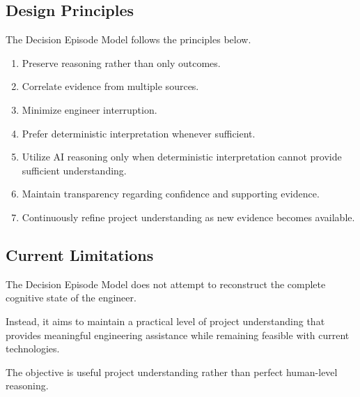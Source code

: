 \subsection{Design Principles}

The Decision Episode Model follows the principles below.

\begin{enumerate}
    \item Preserve reasoning rather than only outcomes.
    \item Correlate evidence from multiple sources.
    \item Minimize engineer interruption.
    \item Prefer deterministic interpretation whenever sufficient.
    \item Utilize AI reasoning only when deterministic interpretation cannot provide sufficient understanding.
    \item Maintain transparency regarding confidence and supporting evidence.
    \item Continuously refine project understanding as new evidence becomes available.
\end{enumerate}

\vspace{0.5cm}

\subsection{Current Limitations}

The Decision Episode Model does not attempt to reconstruct the complete cognitive state of the engineer.

Instead, it aims to maintain a practical level of project understanding that provides meaningful engineering assistance while remaining feasible with current technologies.

The objective is useful project understanding rather than perfect human-level reasoning.